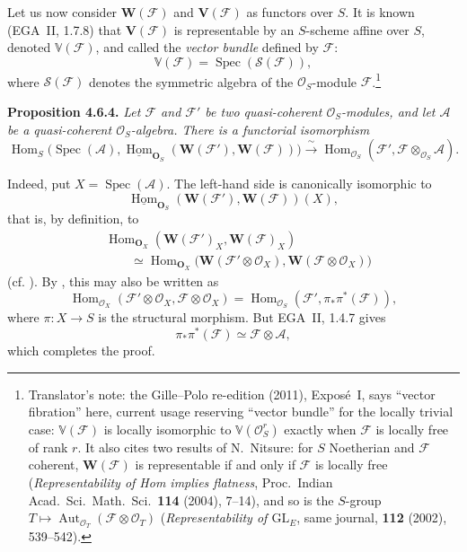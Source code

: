 Let us now consider \(\mathbf W(\mathscr F)\) and \(\mathbf V(\mathscr F)\)
as functors over \(S\). It is known (EGA~II, 1.7.8) that
\(\mathbf V(\mathscr F)\) is representable by an \(S\)-scheme affine over
\(S\), denoted \(\mathbb V(\mathscr F)\), and called the \emph{vector
bundle} defined by \(\mathscr F\):
\[
  \mathbb V(\mathscr F)=\operatorname{Spec}(\mathcal S(\mathscr F)),
\]
where \(\mathcal S(\mathscr F)\) denotes the symmetric algebra of the
\(\mathcal O_S\)-module \(\mathscr F\).\footnote{Translator's note: the Gille--Polo re-edition (2011), Exposé~I, says ``vector
fibration'' here, current usage reserving ``vector bundle'' for the locally
trivial case: \(\mathbb V(\mathscr F)\) is locally isomorphic to
\(\mathbb V(\mathcal O_S^r)\) exactly when \(\mathscr F\) is locally free of
rank \(r\). It also cites two results of N.~Nitsure: for \(S\) Noetherian
and \(\mathscr F\) coherent, \(\mathbf W(\mathscr F)\) is representable if
and only if \(\mathscr F\) is locally free (\textit{Representability of Hom
implies flatness}, Proc.\ Indian Acad.\ Sci.\ Math.\ Sci.\ \textbf{114}
(2004), 7--14), and so is the \(S\)-group
\(T\mapsto\operatorname{Aut}_{\mathcal O_T}(\mathscr F\otimes\mathcal O_T)\)
(\textit{Representability of \(\mathrm{GL}_E\)}, same journal,
\textbf{112} (2002), 539--542).}

\medskip
\noindent{}\textbf{Proposition 4.6.4.}
\textit{Let \(\mathscr F\) and \(\mathscr F'\) be two quasi-coherent
\(\mathcal O_S\)-modules, and let \(\mathscr A\) be a quasi-coherent
\(\mathcal O_S\)-algebra. There is a functorial isomorphism
\[
  \operatorname{Hom}_S
   \bigl(\operatorname{Spec}(\mathscr A),
     \underline{\operatorname{Hom}}_{\mathbf O_S}
       (\mathbf W(\mathscr F'),\mathbf W(\mathscr F))\bigr)
  \xrightarrow{\ \sim\ }
  \operatorname{Hom}_{\mathcal O_S}
    (\mathscr F',\mathscr F\otimes_{\mathcal O_S}\mathscr A).
\]}

Indeed, put \(X=\operatorname{Spec}(\mathscr A)\). The left-hand side is
canonically isomorphic to
\[
  \underline{\operatorname{Hom}}_{\mathbf O_S}
    (\mathbf W(\mathscr F'),\mathbf W(\mathscr F))(X),
\]
that is, by definition, to
\begin{align*}
  &\operatorname{Hom}_{\mathbf O_X}
    (\mathbf W(\mathscr F')_X,\mathbf W(\mathscr F)_X)\\
  &\qquad\simeq
  \operatorname{Hom}_{\mathbf O_X}
    \bigl(\mathbf W(\mathscr F'\otimes\mathcal O_X),
          \mathbf W(\mathscr F\otimes\mathcal O_X)\bigr)
\end{align*}
(cf. ). By , this may also be written as
\[
  \operatorname{Hom}_{\mathcal O_X}
    (\mathscr F'\otimes\mathcal O_X,\mathscr F\otimes\mathcal O_X)
  =
  \operatorname{Hom}_{\mathcal O_S}
    (\mathscr F',\pi_*\pi^*(\mathscr F)),
\]
where \(\pi:X\to S\) is the structural morphism. But EGA~II, 1.4.7
gives
\[
  \pi_*\pi^*(\mathscr F)\simeq\mathscr F\otimes\mathscr A,
\]
which completes the proof.

